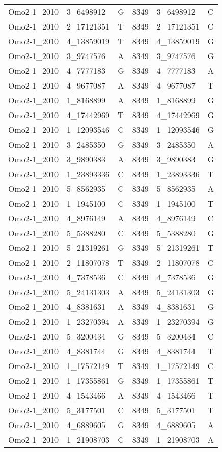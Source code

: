 \begin{center}
\begin{longtable}{|l|l|l|l|l|l|}
Omo2-1\_2010&3\_6498912&G&8349&3\_6498912&C\\
Omo2-1\_2010&2\_17121351&T&8349&2\_17121351&C\\
Omo2-1\_2010&4\_13859019&T&8349&4\_13859019&G\\
Omo2-1\_2010&3\_9747576&A&8349&3\_9747576&G\\
Omo2-1\_2010&4\_7777183&G&8349&4\_7777183&A\\
Omo2-1\_2010&4\_9677087&A&8349&4\_9677087&T\\
Omo2-1\_2010&1\_8168899&A&8349&1\_8168899&G\\
Omo2-1\_2010&4\_17442969&T&8349&4\_17442969&G\\
Omo2-1\_2010&1\_12093546&C&8349&1\_12093546&G\\
Omo2-1\_2010&3\_2485350&G&8349&3\_2485350&A\\
Omo2-1\_2010&3\_9890383&A&8349&3\_9890383&G\\
Omo2-1\_2010&1\_23893336&C&8349&1\_23893336&T\\
Omo2-1\_2010&5\_8562935&C&8349&5\_8562935&A\\
Omo2-1\_2010&1\_1945100&C&8349&1\_1945100&T\\
Omo2-1\_2010&4\_8976149&A&8349&4\_8976149&C\\
Omo2-1\_2010&5\_5388280&C&8349&5\_5388280&G\\
Omo2-1\_2010&5\_21319261&G&8349&5\_21319261&T\\
Omo2-1\_2010&2\_11807078&T&8349&2\_11807078&C\\
Omo2-1\_2010&4\_7378536&C&8349&4\_7378536&G\\
Omo2-1\_2010&5\_24131303&A&8349&5\_24131303&G\\
Omo2-1\_2010&4\_8381631&A&8349&4\_8381631&G\\
Omo2-1\_2010&1\_23270394&A&8349&1\_23270394&G\\
Omo2-1\_2010&5\_3200434&G&8349&5\_3200434&C\\
Omo2-1\_2010&4\_8381744&G&8349&4\_8381744&T\\
Omo2-1\_2010&1\_17572149&T&8349&1\_17572149&C\\
Omo2-1\_2010&1\_17355861&G&8349&1\_17355861&T\\
Omo2-1\_2010&4\_1543466&A&8349&4\_1543466&T\\
Omo2-1\_2010&5\_3177501&C&8349&5\_3177501&T\\
Omo2-1\_2010&4\_6889605&G&8349&4\_6889605&A\\
Omo2-1\_2010&1\_21908703&C&8349&1\_21908703&A\\

\end{longtable}
\end{center}

